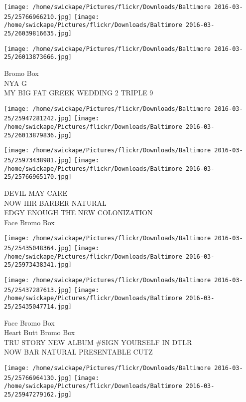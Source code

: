 \documentclass[10pt,letterpaper]{article}
\begin{document}
\texttt{[image: /home/swickape/Pictures/flickr/Downloads/Baltimore 2016-03-25/25766966210.jpg]}
\texttt{[image: /home/swickape/Pictures/flickr/Downloads/Baltimore 2016-03-25/26039816635.jpg]}

\vspace{0.25in}
\texttt{[image: /home/swickape/Pictures/flickr/Downloads/Baltimore 2016-03-25/26013873666.jpg]}

Bromo Box\\
NYA G\\
MY BIG FAT GREEK WEDDING 2 TRIPLE 9\\
\pagebreak

\texttt{[image: /home/swickape/Pictures/flickr/Downloads/Baltimore 2016-03-25/25947281242.jpg]}
\texttt{[image: /home/swickape/Pictures/flickr/Downloads/Baltimore 2016-03-25/26013879836.jpg]}

\texttt{[image: /home/swickape/Pictures/flickr/Downloads/Baltimore 2016-03-25/25973438981.jpg]}
\texttt{[image: /home/swickape/Pictures/flickr/Downloads/Baltimore 2016-03-25/25766965170.jpg]}

DEVIL MAY CARE\\
NOW HIR BARBER NATURAL\\
EDGY ENOUGH THE NEW COLONIZATION\\
Face Bromo Box\\
\pagebreak

\texttt{[image: /home/swickape/Pictures/flickr/Downloads/Baltimore 2016-03-25/25435048364.jpg]}
\texttt{[image: /home/swickape/Pictures/flickr/Downloads/Baltimore 2016-03-25/25973438341.jpg]}

\texttt{[image: /home/swickape/Pictures/flickr/Downloads/Baltimore 2016-03-25/25437287613.jpg]}
\texttt{[image: /home/swickape/Pictures/flickr/Downloads/Baltimore 2016-03-25/25435047714.jpg]}

Face Bromo Box\\
Heart Butt Bromo Box\\
TRU STORY NEW ALBUM \#SIGN YOURSELF IN DTLR\\
NOW BAR NATURAL PRESENTABLE CUTZ\\
\pagebreak

\texttt{[image: /home/swickape/Pictures/flickr/Downloads/Baltimore 2016-03-25/25766964130.jpg]}
\texttt{[image: /home/swickape/Pictures/flickr/Downloads/Baltimore 2016-03-25/25947279162.jpg]}
\end{document}
